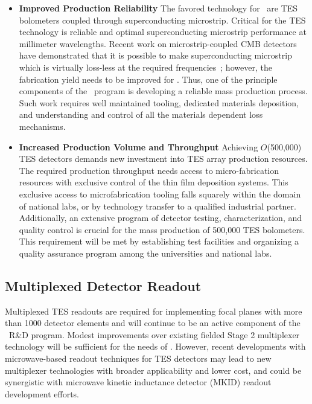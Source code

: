 \begin{itemize}

\item {\bf Improved Production Reliability} The favored technology for
  \cmbexp\ are TES bolometers coupled through superconducting
  microstrip. Critical for the TES technology is reliable and optimal
  superconducting microstrip performance at millimeter
  wavelengths. Recent work on microstrip-coupled CMB detectors have
  demonstrated that it is possible to make superconducting microstrip
  which is virtually loss-less at the required
  frequencies~\cite{sptpol150}; however, the fabrication yield needs
  to be improved for \cmbexp. Thus, one of the principle components of
  the \cmbexp\ program is developing a reliable mass production
  process. Such work requires well maintained tooling, dedicated
  materials deposition, and understanding and control of all the
  materials dependent loss mechanisms.


\item {\bf Increased Production Volume and Throughput} Achieving
  $O$(500,000) TES detectors demands new investment into TES array
  production resources. The required production throughput needs
  access to micro-fabrication resources with exclusive control of the
  thin film deposition systems. This exclusive access to
  microfabrication tooling falls squarely within the domain of
  national labs, or by technology transfer to a qualified industrial partner. Additionally, an extensive program of detector
  testing, characterization, and quality control is crucial for the
  mass production of 500,000 TES bolometers. This requirement will be
  met by establishing test facilities and organizing a quality
  assurance program among the universities and national labs.

\end{itemize}



\subsection{Multiplexed Detector Readout}

 Multiplexed TES readouts are
  required for implementing focal planes with more than 1000 detector
  elements and will continue to be an active component of the
  \cmbexp\ R\&D program. Modest improvements over existing fielded
  Stage 2 multiplexer technology will be sufficient for the needs of
  \cmbexp. However, recent developments with microwave-based readout
  techniques for TES detectors may lead to new multiplexer technologies
  with broader applicability and lower cost, and could be synergistic
  with microwave kinetic inductance detector (MKID) readout development efforts.   


